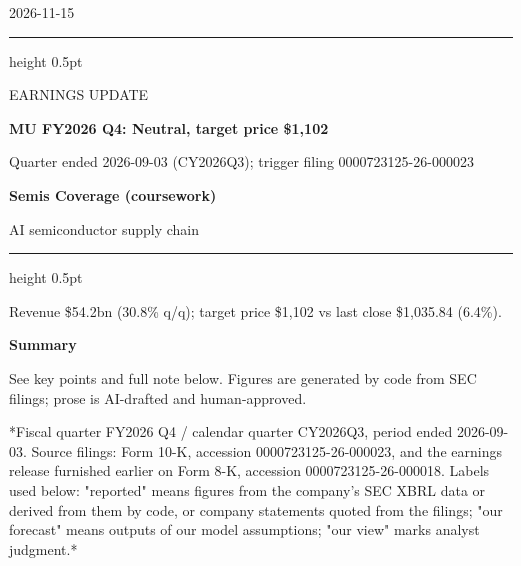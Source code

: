 \documentclass[a4paper,10pt]{article}
\newcommand{\ReportTitle}{MU FY2026 Q4: Neutral, target price \$1,102}
\newcommand{\ReportType}{EARNINGS UPDATE}
\newcommand{\ReportDate}{2026-11-15}
\newcommand{\ReportScope}{Quarter ended 2026-09-03 (CY2026Q3); trigger filing 0000723125-26-000023}
\newcommand{\TeamName}{Semis Coverage (coursework)}
\newcommand{\DeskName}{AI semiconductor supply chain}
\newcommand{\KeyFinding}{Revenue \$54.2bn (30.8\% q/q); target price \$1,102 vs last close \$1,035.84 (6.4\%).}
\begin{document}
\begin{minipage}[t]{0.70\textwidth}
\vspace{0pt}
{\small\ReportDate}\par\medskip
{\color{MemoBlue}\hrule height 0.5pt}\smallskip
{\large\ReportType}\par
{\LARGE\bfseries\ReportTitle}\par\medskip
\ReportScope
\end{minipage}\hfill
\begin{minipage}[t]{0.23\textwidth}
\vspace{0pt}\raggedleft
\colorbox{MemoBlue}{\parbox[c][19mm][c]{0.86\linewidth}{\centering\color{white}\bfseries\TeamName}}\par\medskip
\DeskName
\end{minipage}
\par\bigskip
{\color{MemoBlue}\hrule height 0.5pt}\medskip
{\large\KeyFinding}\par\bigskip

\begin{minipage}[t]{0.61\textwidth}
\vspace{0pt}\raggedright
\setlength{\parskip}{4pt}
\textbf{Summary}\par
See key points and full note below. Figures are generated by code from SEC filings; prose is AI-drafted and human-approved.
\end{minipage}\hfill
\begin{minipage}[t]{0.36\textwidth}
\vspace{0pt}\small
\medskip
{}
\end{minipage}
\par\bigskip



*Fiscal quarter FY2026 Q4 / calendar quarter CY2026Q3, period ended 2026-09-03. Source filings: Form 10-K, accession 0000723125-26-000023, and the earnings release furnished earlier on Form 8-K, accession 0000723125-26-000018. Labels used below: "reported" means figures from the company's SEC XBRL data or derived from them by code, or company statements quoted from the filings; "our forecast" means outputs of our model assumptions; "our view" marks analyst judgment.*
\end{document}
